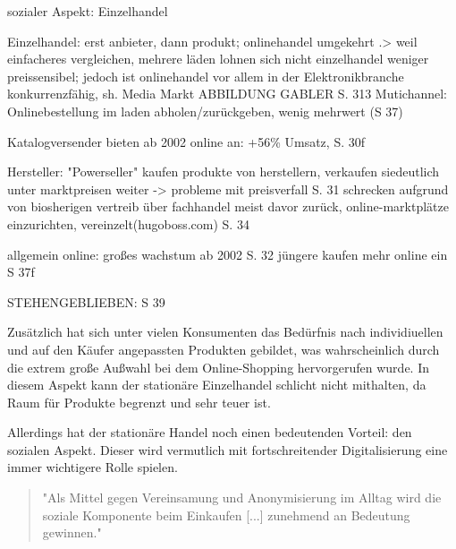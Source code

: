         sozialer Aspekt: Einzelhandel
        
        Einzelhandel: erst anbieter, dann produkt; onlinehandel umgekehrt
            .> weil einfacheres vergleichen, mehrere läden lohnen sich nicht
            einzelhandel weniger preissensibel; jedoch ist onlinehandel vor allem in der Elektronikbranche konkurrenzfähig, sh. Media Markt\cite[S. 27]{Graf}
            ABBILDUNG GABLER S. 313
        Mutichannel: Onlinebestellung im laden abholen/zurückgeben, wenig mehrwert (S 37) 
            
        {
        Katalogversender bieten ab 2002 online an: +56\% Umsatz, S. 30f
        }
        
        Hersteller: "Powerseller" kaufen produkte von herstellern, verkaufen siedeutlich unter marktpreisen weiter -> probleme mit preisverfall S. 31
        schrecken aufgrund von biosherigen vertreib über fachhandel meist davor zurück, online-marktplätze einzurichten, vereinzelt(hugoboss.com) S. 34
        
        allgemein online: großes wachstum ab 2002 S. 32
            jüngere kaufen mehr online ein S 37f
            
    STEHENGEBLIEBEN: S 39
\fi

Zusätzlich hat sich unter vielen Konsumenten das Bedürfnis nach individiuellen und auf den Käufer angepassten Produkten gebildet\cite[S. 43]{Nitt}, was wahrscheinlich durch die extrem große Außwahl bei dem Online-Shopping hervorgerufen wurde. In diesem Aspekt kann der stationäre Einzelhandel schlicht nicht mithalten, da Raum für Produkte begrenzt und sehr teuer ist. 
\iffalse
> billig - strategie vorallem von amazon und alibaba

veranschaulichung eigene tabelle börsenwert einzelner unternehmen

Dabei gibt es auch unternehmen, die mehrere berieche nutzen, wie amazon
\fi

Allerdings hat der stationäre Handel noch einen bedeutenden Vorteil: den sozialen Aspekt. Dieser wird vermutlich mit fortschreitender Digitalisierung eine immer wichtigere Rolle spielen\cite[S. 50]{Ebert}.
\begin{quote}
"Als Mittel gegen Vereinsamung und Anonymisierung im Alltag wird die soziale Komponente beim Einkaufen [...] zunehmend an Bedeutung gewinnen."\cite[S. 43]{Nitt}
\end{quote}
